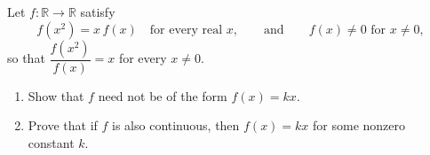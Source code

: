 Let $f:\mathbb{R}\to\mathbb{R}$ satisfy
\[f\left(x^2\right)=x\,f(x)\quad\text{for every real }x,\qquad\text{and}\qquad f(x)\ne0\text{ for }x\ne0,\]
so that $\dfrac{f\left(x^2\right)}{f(x)}=x$ for every $x\ne0$.
\begin{enumerate}
\item[(a)] Show that $f$ need not be of the form $f(x)=kx$.
\item[(b)] Prove that if $f$ is also continuous, then $f(x)=kx$ for some nonzero constant $k$.
\end{enumerate}
